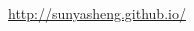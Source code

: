 \documentclass[10pt,twocolumn,letterpaper]{article}
\begin{document}
    {\small
    
    
    }
    \begin{thebibliography}{1}

    \url{http://sunyasheng.github.io/}
    \end{thebibliography}

    
\end{document}
